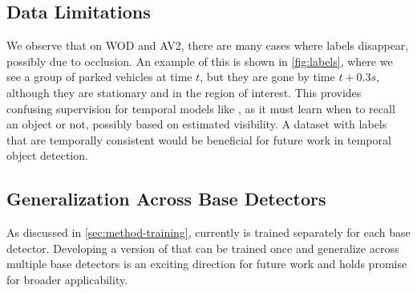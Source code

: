 \subsection{Data Limitations}

We observe that on WOD and AV2, there are many cases where labels disappear, possibly due to occlusion.
An example of this is shown in \cref{fig:labels}, where we see a group of parked vehicles at time $t$,
but they are gone by time $t + 0.3s$, although they are stationary and in the region of interest.
This provides confusing supervision for temporal models like \ourmodel{}, as it must learn when to recall an object or not,
possibly based on estimated visibility.
A dataset with labels that are temporally consistent would be beneficial for future work in temporal object detection.

\subsection{Generalization Across Base Detectors}

As discussed in \cref{sec:method-training}, currently \ourmodel{} is trained separately for each base detector.
Developing a version of \ourmodel{} that can be trained once and generalize
across multiple base detectors is an exciting direction for future work
and holds promise for broader applicability.


